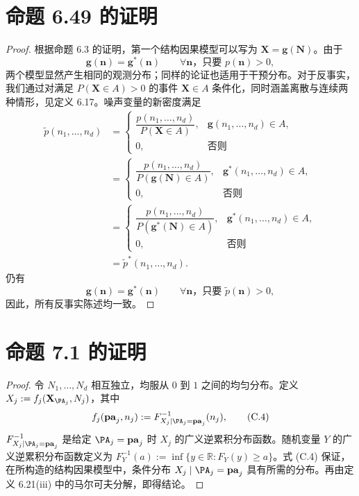 \section{命题 6.49 的证明}
\begin{proof}
根据命题 6.3 的证明，第一个结构因果模型可以写为 $\mathbf X=\mathbf g(\mathbf N)$。由于
\[\mathbf g(\mathbf n)=\mathbf g^*(\mathbf n)\qquad\forall\mathbf n\text{，只要 }p(\mathbf n)>0,\]
两个模型显然产生相同的观测分布；同样的论证也适用于干预分布。对于反事实，我们通过对满足 $P(\mathbf X\in A)>0$ 的事件 $\mathbf X\in A$ 条件化，同时涵盖离散与连续两种情形，见定义 6.17。噪声变量的新密度满足
\[\begin{aligned}
\widetilde p(n_1,\ldots,n_d)
&=\begin{cases}\dfrac{p(n_1,\ldots,n_d)}{P(\mathbf X\in A)},&\mathbf g(n_1,\ldots,n_d)\in A,\\0,&\text{否则}\end{cases}\\[3pt]
&=\begin{cases}\dfrac{p(n_1,\ldots,n_d)}{P(\mathbf g(\mathbf N)\in A)},&\mathbf g^*(n_1,\ldots,n_d)\in A,\\0,&\text{否则}\end{cases}\\[3pt]
&=\begin{cases}\dfrac{p(n_1,\ldots,n_d)}{P(\mathbf g^*(\mathbf N)\in A)},&\mathbf g^*(n_1,\ldots,n_d)\in A,\\0,&\text{否则}\end{cases}\\[3pt]
&=\widetilde p^*(n_1,\ldots,n_d).
\end{aligned}\]
仍有
\[\mathbf g(\mathbf n)=\mathbf g^*(\mathbf n)\qquad\forall\mathbf n\text{，只要 }\widetilde p(\mathbf n)>0,\]
因此，所有反事实陈述均一致。
\end{proof}

\section{命题 7.1 的证明}
\begin{proof}
令 $N_1,\ldots,N_d$ 相互独立，均服从 $0$ 到 $1$ 之间的均匀分布。定义 $X_j:=f_j(\mathbf X_{\PA_j},N_j)$，其中
\begin{equation}
f_j(\mathbf{pa}_j,n_j):=F_{X_j\mid\PA_j=\mathbf{pa}_j}^{-1}(n_j),
\tag{C.4}
\end{equation}
$F_{X_j\mid\PA_j=\mathbf{pa}_j}^{-1}$ 是给定 $\PA_j=\mathbf{pa}_j$ 时 $X_j$ 的广义逆累积分布函数。随机变量 $Y$ 的广义逆累积分布函数定义为 $F_Y^{-1}(a):=\inf\{y\in\mathbb R\colon F_Y(y)\ge a\}$。式 (C.4) 保证，在所构造的结构因果模型中，条件分布 $X_j\mid\PA_j=\mathbf{pa}_j$ 具有所需的分布。再由定义 6.21(iii) 中的马尔可夫分解，即得结论。
\end{proof}

